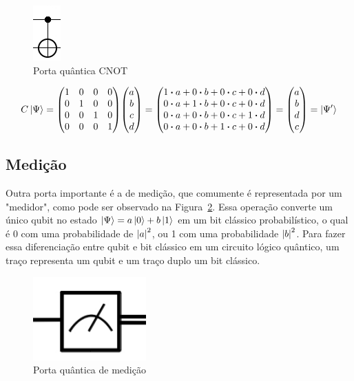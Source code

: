 \documentclass[a4paper, 12pt, oneside]{book}
\begin{document}
\begin{figure}[H]
\centering
\includegraphics[scale=0.80]{cnot.png}
\caption{Porta quântica CNOT}
\label{fig:CNOT}
\end{figure}

\begin{equation}\label{eqFullCNOT}
C\ket{\Psi} = \mqty(1&0&0&0\\0&1&0&0\\0&0&1&0\\0&0&0&1)\mqty(a\\b\\c\\d) = 
\mqty(1 \vdot a+0 \vdot b +0 \vdot c +0 \vdot d \\
	  0 \vdot a+1 \vdot b +0 \vdot c +0 \vdot d \\
	  0 \vdot a+0 \vdot b +0 \vdot c +1 \vdot d \\
	  0 \vdot a+0 \vdot b +1 \vdot c +0 \vdot d ) 
= \mqty(a\\b\\d\\c) = \ket{\Psi'}
\end{equation}

\subsection{Medição}
Outra porta importante é a de medição, que comumente é representada por um "medidor", como pode ser observado na Figura~\ref{fig:medicao}. Essa operação converte um único qubit no estado $\ket{\Psi}=a\ket{0}+b\ket{1}$ em um bit clássico probabilístico, o qual é 0 com uma probabilidade de $\abs{a}^2$, ou 1 com uma probabilidade $\abs{b}^2$. Para fazer essa diferenciação entre qubit e bit clássico em um circuito lógico quântico, um traço representa um qubit e um traço duplo um bit clássico.


\begin{figure}[H]
\centering
\includegraphics[scale=0.40]{medicao.png}
\caption{Porta quântica de medição}
\label{fig:medicao}
\end{figure}
\end{document}
